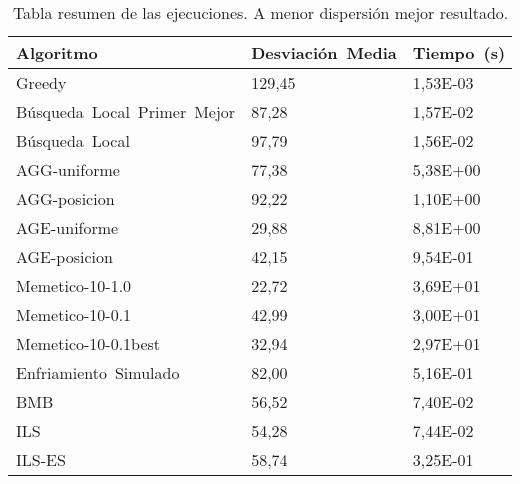 \begin{table}[!ht]%
    \centering
    \begin{tabular}{|l|l|l|}
        \hline
        \textbf{Algoritmo} & \textbf{Desviación~Media} & \textbf{Tiempo~(s)} \\ \hline
        Greedy & 129,45 & 1,53E-03 \\ \hline
        Búsqueda~Local~Primer~Mejor & 87,28 & 1,57E-02 \\ \hline
        Búsqueda~Local & 97,79 & 1,56E-02 \\ \hline
        AGG-uniforme & 77,38 & 5,38E+00 \\ \hline
        AGG-posicion & 92,22 & 1,10E+00 \\ \hline
        AGE-uniforme & 29,88 & 8,81E+00 \\ \hline
        AGE-posicion & 42,15 & 9,54E-01 \\ \hline
        Memetico-10-1.0 & 22,72 & 3,69E+01 \\ \hline
        Memetico-10-0.1 & 42,99 & 3,00E+01 \\ \hline
        Memetico-10-0.1best & 32,94 & 2,97E+01 \\ \hline
        Enfriamiento~Simulado & 82,00 & 5,16E-01 \\ \hline
        BMB & 56,52 & 7,40E-02 \\ \hline
        ILS & 54,28 & 7,44E-02 \\ \hline
        ILS-ES & 58,74 & 3,25E-01 \\ \hline
    \end{tabular}
\caption{Tabla resumen de las ejecuciones. A menor dispersión mejor resultado.}
\end{table}